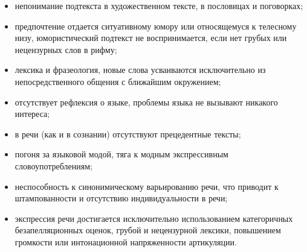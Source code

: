 \begin{itemize}
    \item непонимание подтекста в художественном тексте, в пословицах и поговорках;
    \item предпочтение отдается ситуативному юмору или относящемуся к телесному низу, юмористический подтекст не воспринимается, если нет грубых или нецензурных слов в рифму;
    \item лексика и фразеология, новые слова усваиваются исключительно из непосредственного общения с ближайшим окружением;
    \item отсутствует рефлексия о языке, проблемы языка не вызывают никакого интереса;
    \item в речи (как и в сознании) отсутствуют прецедентные тексты;
    \item погоня за языковой модой, тяга к модным экспрессивным словоупотреблениям;
    \item неспособность к синонимическому варьированию речи, что приводит к штампованности и отсутствию индивидуальности в речи;
    \item экспрессия речи достигается исключительно использованием категоричных безапелляционных оценок, грубой и нецензурной лексики, повышением громкости или интонационной напряженности артикуляции.
\end{itemize}
